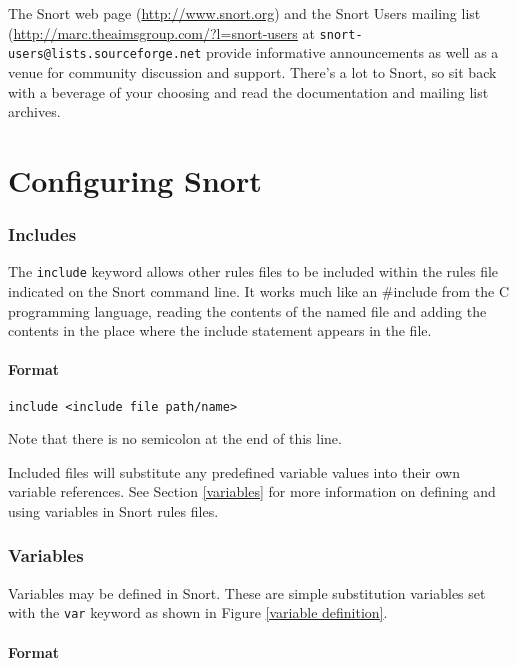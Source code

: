 \documentclass[english]{report}
\newenvironment{note}{
\samepage
    \vspace{10pt}{\textsf{
        {\hspace{7pt}\Huge{$\triangle$\hspace{-12.5pt}{\Large{$^!$}}}}\hspace{5pt}
        {\Large{NOTE}}
    }
    }
   \begin{center}
    \par\vspace{-17pt}

    \begin{lrbox}{\savepar}
    \begin{minipage}[r]{6in}
}
{
    \end{minipage}
    \end{lrbox}
    \fbox{
        \usebox{
            \savepar
	}
    }
    \par\vskip10pt
    \end{center}
}
\begin{document}
The Snort web page (\url{http://www.snort.org}) and the Snort Users mailing
list (\url{http://marc.theaimsgroup.com/?l=snort-users} at
\verb?snort-users@lists.sourceforge.net? provide informative announcements as
well as a venue for community discussion and support. There's a lot to Snort, so
sit back with a beverage of your choosing and read the documentation and
mailing list archives.

\newpage
\chapter{Configuring Snort \label{Configuring Snort}}

\subsection{Includes}

The {\tt include} keyword allows other rules files to be included within the rules
file indicated on the Snort command line. It works much like an \#include from
the C programming language, reading the contents of the named file and adding the contents
in the place where the include statement appears in the file.

\subsubsection{Format}
\begin{verbatim}
include <include file path/name>
\end{verbatim}

\begin{note}
Note that there is no semicolon at the end of this line. 
\end{note}

Included files will
substitute any predefined variable values into their own variable references.
See Section \ref{variables} for more information on defining and
using variables in Snort rules files.

\subsection{Variables \label{variables}}

Variables may be defined in Snort. These are simple substitution variables
set with the {\tt var} keyword as shown in Figure \ref{variable definition}.

\subsubsection{Format}
\end{document}
